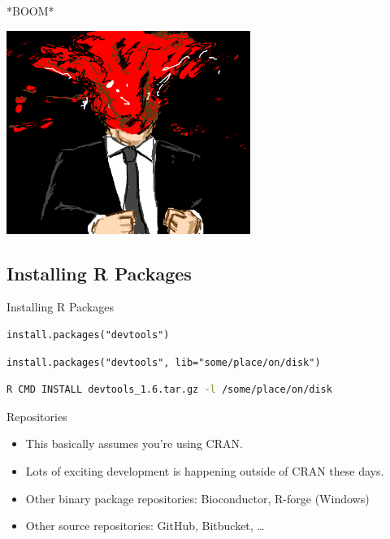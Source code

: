 \begin{frame}
  \begin{block}{*BOOM*}
  \begin{center}
    \includegraphics[scale=.82]{pics/head_explosion}
  \end{center}
  \end{block}
\end{frame}


\subsection{Installing R Packages}
\makesubcontentsslidessec


\begin{frame}[fragile]
  \begin{block}{Installing R Packages}
\begin{lstlisting}
install.packages("devtools")
\end{lstlisting}
\pause
\begin{lstlisting}
install.packages("devtools", lib="some/place/on/disk")
\end{lstlisting}
\pause
\begin{lstlisting}[language=sh]
R CMD INSTALL devtools_1.6.tar.gz -l /some/place/on/disk
\end{lstlisting}
  \end{block}
\end{frame}


\begin{frame}
  \begin{block}{Repositories}
  \begin{itemize}
    \item This basically assumes you're using CRAN.\pause
    \item Lots of exciting development is happening outside of CRAN these 
days.\pause
    \item Other binary package repositories: Bioconductor, R-forge (Windows)
\pause
    \item Other source repositories: GitHub, Bitbucket, \dots 
  \end{itemize}
  \end{block}
\end{frame}


